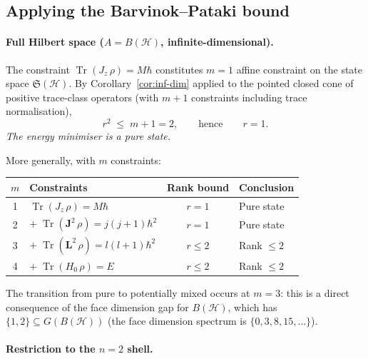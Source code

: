 \documentclass[11pt,a4paper]{article}
\theoremstyle{definition}
\newcommand{\Tr}{\operatorname{Tr}}
\begin{document}
\subsection{Applying the Barvinok--Pataki bound}

\paragraph{Full Hilbert space ($A = B(\mathcal{H})$, infinite-dimensional).}

The constraint $\Tr(J_z\,\rho) = M\hbar$ constitutes $m = 1$ affine
constraint on the state space $\mathfrak{S}(\mathcal{H})$.  By
Corollary~\ref{cor:inf-dim} applied to the pointed closed cone of
positive trace-class operators (with $m + 1$ constraints including
trace normalisation),
\[
  r^2 \;\leq\; m + 1 = 2,
  \qquad\text{hence}\qquad r = 1.
\]
\emph{The energy minimiser is a pure state.}

More generally, with $m$ constraints:
\begin{center}
\begin{tabular}{clcl}
\toprule
$m$ & \textbf{Constraints} & \textbf{Rank bound} & \textbf{Conclusion} \\
\midrule
1 & $\Tr(J_z\,\rho) = M\hbar$ & $r = 1$ & Pure state \\
2 & $+ \;\Tr(\mathbf{J}^2\,\rho) = j(j+1)\hbar^2$ & $r = 1$ & Pure state \\
3 & $+ \;\Tr(\mathbf{L}^2\,\rho) = l(l+1)\hbar^2$ & $r \leq 2$ & Rank $\leq 2$ \\
4 & $+ \;\Tr(H_0\,\rho) = E$ & $r \leq 2$ & Rank $\leq 2$ \\
\bottomrule
\end{tabular}
\end{center}
The transition from pure to potentially mixed occurs at $m = 3$: this
is a direct consequence of the face dimension gap for
$B(\mathcal{H})$, which has $\{1, 2\} \subseteq G(B(\mathcal{H}))$
(the face dimension spectrum is $\{0, 3, 8, 15, \ldots\}$).

\paragraph{Restriction to the $n = 2$ shell.}
\end{document}
